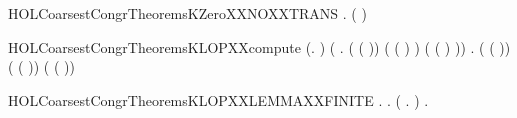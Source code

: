\newcommand{\HOLCoarsestCongrTheoremsINFINITEXXEXISTSXXLEMMA}{\UseVerbatim{HOLCoarsestCongrTheoremsINFINITEXXEXISTSXXLEMMA}}
\begin{SaveVerbatim}{HOLCoarsestCongrTheoremsKZeroXXNOXXTRANS}
\HOLTokenTurnstile{} \HOLSymConst{\HOLTokenForall{}}  . \HOLSymConst{\HOLTokenNeg{}}(   \HOLTokenTransBegin{}\HOLTokenTransEnd {})
\end{SaveVerbatim}
\newcommand{\HOLCoarsestCongrTheoremsKZeroXXNOXXTRANS}{\UseVerbatim{HOLCoarsestCongrTheoremsKZeroXXNOXXTRANS}}
\begin{SaveVerbatim}{HOLCoarsestCongrTheoremsKLOPXXcompute}
\HOLTokenTurnstile{} (\HOLSymConst{\HOLTokenForall{}}.    \HOLSymConst{=} ) \HOLSymConst{\HOLTokenConj{}}
   (\HOLSymConst{\HOLTokenForall{}} .
          ( ( )) \HOLSymConst{=}
          ( ( ) \HOLSymConst{\ensuremath{-}} ) \HOLSymConst{\ensuremath{+}}
           ( ( ) \HOLSymConst{\ensuremath{-}} )) \HOLSymConst{\HOLTokenConj{}}
   \HOLSymConst{\HOLTokenForall{}} .
         ( ( )) \HOLSymConst{=}
         ( ( )) \HOLSymConst{\ensuremath{+}}
          ( ( ))
\end{SaveVerbatim}
\newcommand{\HOLCoarsestCongrTheoremsKLOPXXcompute}{\UseVerbatim{HOLCoarsestCongrTheoremsKLOPXXcompute}}
\begin{SaveVerbatim}{HOLCoarsestCongrTheoremsKLOPXXLEMMAXXFINITE}
\HOLTokenTurnstile{} \HOLSymConst{\HOLTokenForall{}} .
         \HOLSymConst{\HOLTokenConj{}}   \HOLSymConst{\HOLTokenImp{}}
       \HOLSymConst{\HOLTokenExists{}}.
             \HOLSymConst{\HOLTokenConj{}} (\HOLSymConst{\HOLTokenForall{}} .  \HOLTokenWeakTransBegin{}\HOLTokenImp{}  \HOLSymConst{\HOLTokenImp{}} \HOLSymConst{\HOLTokenNeg{}}  ) \HOLSymConst{\HOLTokenConj{}}
           \HOLSymConst{\HOLTokenForall{}} .  \HOLTokenWeakTransBegin{}\HOLTokenImp{}  \HOLSymConst{\HOLTokenImp{}} \HOLSymConst{\HOLTokenNeg{}}  
\end{SaveVerbatim}
